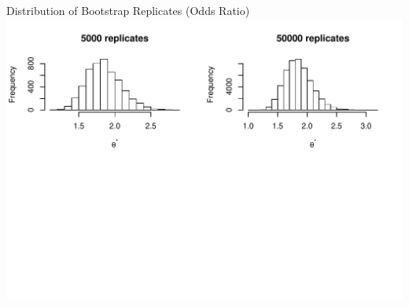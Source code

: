 \documentclass[a4paper,9pt]{beamer}\usepackage[]{graphicx}\usepackage[]{color}
\makeatletter
\def\maxwidth{ %
  \ifdim\Gin@nat@width>\linewidth
    \linewidth
  \else
    \Gin@nat@width
  \fi
}
\newenvironment{knitrout}{}{} %
\makeatother
\begin{document}
\begin{frame}{Distribution of Bootstrap Replicates (Odds Ratio)}
\begin{knitrout}
\color{fgcolor}
\includegraphics[width=\maxwidth]{figure/plots41-1} 

\end{knitrout}
\end{frame}
\end{document}
